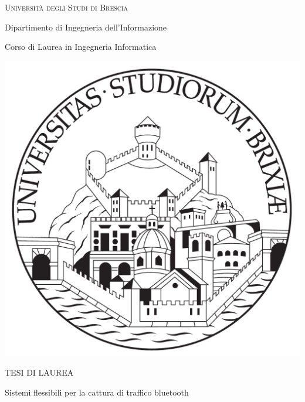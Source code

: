 \documentclass[12pt,a4paper]{report}
\begin{document}
\begin{titlepage}

	\centering
	{\scshape \LARGE  Università degli Studi di Brescia \par}
	
	{\lsstyle \LARGE Dipartimento di Ingegneria dell'Informazione \par} 
	\vspace{12pt}
	
	{\Large Corso di Laurea in Ingegneria Informatica \par}
	\vspace{1.75 cm}

	\includegraphics[scale=0.11]{logo} \par
	\vspace{1.75 cm}
	
	{\lsstyle TESI DI LAUREA\par}
	
	\vspace{0.5 cm}
	
	{\lsstyle \LARGE Sistemi flessibili per la cattura di traffico bluetooth \par}
	
	\vspace{3cm}
	
	\begin{minipage}{0.75\textwidth}
		\begin{flushleft}
		{
		
}
\end{flushleft}
\end{minipage}
\end{titlepage}
\end{document}
